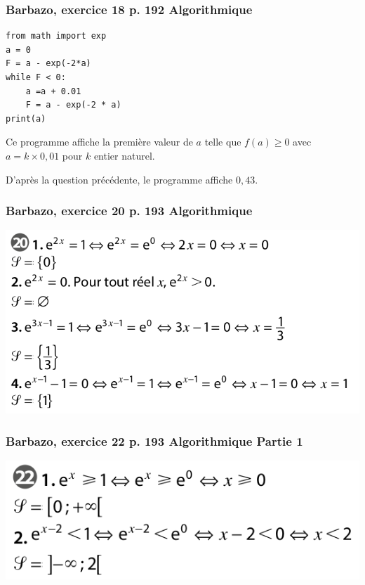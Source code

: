 \documentclass[11pt, hyperref={urlcolor=red,%
            linkcolor=blue, %
            colorlinks=true}]{beamer}
\begin{document}
\begin{frame}[fragile]
\frametitle{Barbazo, exercice 18 p. 192 Algorithmique}

\begin{lstlisting}
from math import exp
a = 0
F = a - exp(-2*a)
while F < 0:
	a =a + 0.01
	F = a - exp(-2 * a)
print(a)
\end{lstlisting}

Ce programme affiche la première valeur de $a$ telle que $f(a)\geqslant 0$ avec $a=k \times 0,01$ pour $k$ entier naturel.

D'après la question précédente, le programme affiche $0,43$.

\end{frame}


\begin{frame}
\frametitle{Barbazo, exercice 20 p. 193 Algorithmique}
\label{exo20}
\begin{center}
	\includegraphics[scale=0.3]{exo20.png}
\end{center}

\end{frame}

\begin{frame}
\frametitle{Barbazo, exercice 22 p. 193 Algorithmique Partie 1}
\label{exo22}
\begin{center}
	\includegraphics[scale=0.3]{exo22-Part1.png}
\end{center}

\end{frame}
\end{document}
